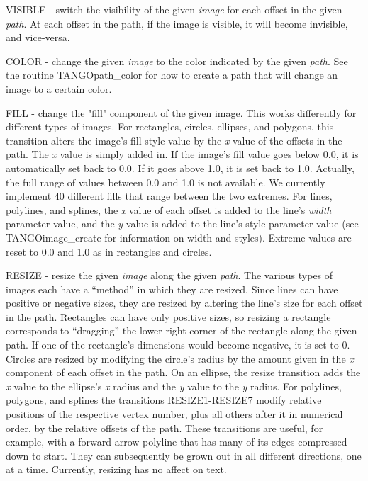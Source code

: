 VISIBLE - switch the visibility of the given {\em image} for each offset in
the given {\em path}.  At each offset in the path, if the image is visible, it
will become invisible, and vice-versa.

COLOR - change the given {\em image} to the color indicated by the
given {\em path}.  See the routine TANGOpath\_color for how to create a
path that will change an image to a certain color.  

FILL - change the "fill" component of the given image.  This works
differently for different types of images.  For rectangles, circles,
ellipses, and polygons, this transition alters the image's fill style
value by the {\em x} value of the offsets in the path.  The {\em x}
value is simply added in.  If the image's fill value goes below 0.0,
it is automatically set back to 0.0.  If it goes above 1.0, it is set
back to 1.0.  Actually, the full range of values between 0.0 and 1.0
is not available.  We currently implement 40 different fills that
range between the two extremes.  For lines, polylines, and splines,
the {\em x} value of each offset is added to the line's {\em width}
parameter value, and the {\em y} value is added to the line's style
parameter value (see TANGOimage\_create for information on width and
styles).  Extreme values are reset to 0.0 and 1.0 as in rectangles and
circles.

RESIZE - resize the given {\em image} along the given {\em path}.
The various types of images each have a ``method'' in which they are resized.
Since lines can have positive or negative sizes, they are resized by altering
the line's size for each offset in the path. Rectangles can have only positive
sizes, so resizing a rectangle corresponds to ``dragging'' the lower right
corner of the rectangle along the given path. If one of the rectangle's
dimensions would become negative, it is set to 0. Circles are resized by
modifying the circle's radius by the amount given in the {\em x} component of
each offset in the path.  On an ellipse, the resize transition adds the
{\em x} value to the ellipse's {\em x} radius and the {\em y} value to the
{\em y} radius.  For polylines, polygons, and splines the transitions
RESIZE1-RESIZE7 modify relative positions of the respective vertex number,
plus all others after it in numerical order, by the relative offsets of the
path.  These transitions are useful, for example, with a forward arrow
polyline that has many of its edges compressed down to start.  They can
subsequently be grown out in all different directions, one at a time.
Currently, resizing has no affect on text.

